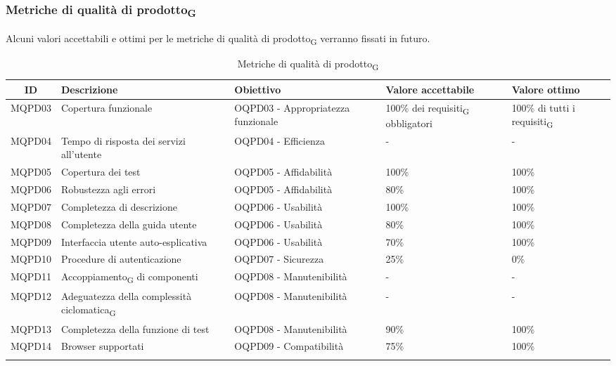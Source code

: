 \newpage
\subsubsection{Metriche di qualità di prodotto\textsubscript{G}}
Alcuni valori accettabili e ottimi per le metriche di qualità di prodotto\textsubscript{G} verranno fissati in futuro.
\begin{center}
	\setlength\extrarowheight{2pt}
	\begin{xltabular}{\textwidth}{|c|X|X|X|X|}
		\hline
		\textbf{ID} & \textbf{Descrizione} & \textbf{Obiettivo} & \textbf{Valore accettabile} & \textbf{Valore ottimo}\\
		\hline
		MQPD03 & Copertura funzionale & OQPD03 - Appropriatezza funzionale & 100\% dei requisiti\textsubscript{G} obbligatori & 100\% di tutti i requisiti\textsubscript{G}\\
		\hline
		MQPD04 & Tempo di risposta dei servizi all'utente & OQPD04 - Efficienza & - & - \\
		\hline
		MQPD05 & Copertura dei test & OQPD05 - Affidabilità & 100\% & 100\% \\
		\hline
		MQPD06 & Robustezza agli errori & OQPD05 - Affidabilità & 80\% & 100\% \\
		\hline
		MQPD07 & Completezza di descrizione & OQPD06 - Usabilità & 100\% &  100\% \\
		\hline
		MQPD08 & Completezza della guida utente & OQPD06 - Usabilità & 80\% &  100\% \\
		\hline
		MQPD09 & Interfaccia utente auto-esplicativa & OQPD06 - Usabilità & 70\% &  100\% \\
		\hline
		MQPD10 & Procedure di autenticazione & OQPD07 - Sicurezza & 25\% &  0\% \\
		\hline
		MQPD11 & Accoppiamento\textsubscript{G} di componenti & OQPD08 - Manutenibilità & - & - \\
		\hline
		MQPD12 & Adeguatezza della complessità ciclomatica\textsubscript{G} & OQPD08 - Manutenibilità & - & - \\
		\hline
		MQPD13 & Completezza della funzione di test & OQPD08 - Manutenibilità & 90\% & 100\% \\
		\hline
		MQPD14 & Browser supportati & OQPD09 - Compatibilità & 75\% & 100\% \\
		\hline
		\caption{Metriche di qualità di prodotto\textsubscript{G}}
	\end{xltabular}
\end{center}
